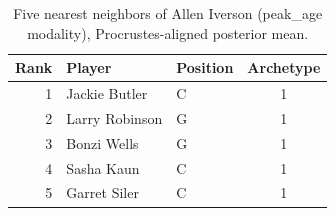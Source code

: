 \begin{table}[htbp]
  \centering\small
  \begin{tabular}{rllc}
    \toprule
    Rank & Player & Position & Archetype \\
    \midrule
    1 & Jackie Butler & C & 1 \\
    2 & Larry Robinson & G & 1 \\
    3 & Bonzi Wells & G & 1 \\
    4 & Sasha Kaun & C & 1 \\
    5 & Garret Siler & C & 1 \\
    \bottomrule
  \end{tabular}
  \caption{Five nearest neighbors of Allen Iverson (peak_age modality), Procrustes-aligned posterior mean.}
  \label{tab:Allen_Iverson_neighbors_peak_age}
\end{table}

